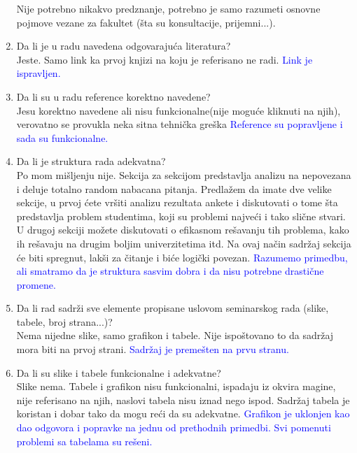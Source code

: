 \documentclass[a4paper]{report}
\newcommand{\odgovor}[1]{\textcolor{blue}{#1}}
\begin{document}
\begin{enumerate}
Nije potrebno nikakvo predznanje, potrebno je samo razumeti osnovne pojmove vezane za fakultet (šta su konsultacije, prijemni...).
\item Da li je u radu navedena odgovarajuća literatura?\\
Jeste. Samo link ka prvoj knjizi na koju je referisano ne radi. \odgovor{Link je ispravljen.} 
\item Da li su u radu reference korektno navedene?\\
Jesu korektno navedene ali nisu funkcionalne(nije moguće kliknuti na njih), verovatno se provukla neka sitna tehnička greška \odgovor{Reference su popravljene i sada su funkcionalne.} 
\item Da li je struktura rada adekvatna?\\
Po mom mišljenju nije. Sekcija za sekcijom predstavlja analizu na nepovezana i deluje totalno random nabacana pitanja. Predlažem da imate dve velike sekcije, u prvoj ćete vršiti analizu rezultata ankete i diskutovati o tome šta predstavlja problem studentima, koji su problemi najveći i tako slične stvari. U drugoj sekciji možete diskutovati o efikasnom rešavanju tih problema, kako ih rešavaju na drugim boljim univerzitetima itd. Na ovaj način sadržaj sekcija će biti spregnut, lakši za čitanje i biće logički povezan. \odgovor{Razumemo primedbu, ali smatramo da je struktura sasvim dobra i da nisu potrebne drastične promene.} 
\item Da li rad sadrži sve elemente propisane uslovom seminarskog rada (slike, tabele, broj strana...)?\\
Nema nijedne slike, samo grafikon i tabele. Nije ispoštovano to da sadržaj mora biti na prvoj strani. \odgovor{Sadržaj je premešten na prvu stranu.} 
\item Da li su slike i tabele funkcionalne i adekvatne?\\
Slike nema. Tabele i grafikon nisu funkcionalni, ispadaju iz okvira magine, nije referisano na njih, naslovi tabela nisu iznad nego ispod. Sadržaj tabela je koristan i dobar tako da mogu reći da su adekvatne. \odgovor{Grafikon je uklonjen kao dao odgovora i popravke na jednu od prethodnih primedbi. Svi pomenuti problemi sa tabelama su rešeni.}
\end{enumerate}
\end{document}
